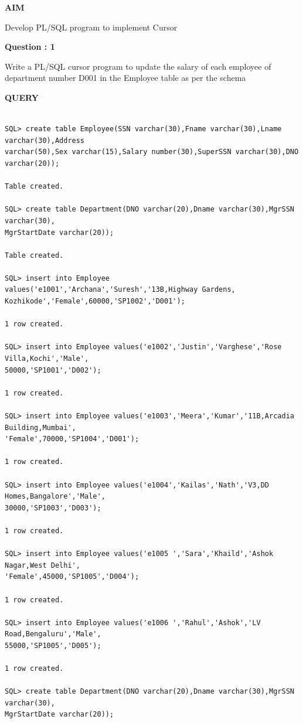 \documentclass[a4paper,12pt]{report}
\begin{document}
\begin{flushleft}
\textbf{AIM }
\end{flushleft}
Develop PL/SQL program to implement Cursor

\begin{flushleft}
    \textbf{Question : 1}
\end{flushleft}
Write a PL/SQL cursor program to update the salary of each employee of department number D001 in the Employee table as per the schema
\begin{flushleft}
\textbf{QUERY }
\end{flushleft}
 \begin{verbatim}

SQL> create table Employee(SSN varchar(30),Fname varchar(30),Lname varchar(30),Address
varchar(50),Sex varchar(15),Salary number(30),SuperSSN varchar(30),DNO varchar(20));

Table created.

SQL> create table Department(DNO varchar(20),Dname varchar(30),MgrSSN varchar(30),
MgrStartDate varchar(20));

Table created.

SQL> insert into Employee values('e1001','Archana','Suresh','13B,Highway Gardens,
Kozhikode','Female',60000,'SP1002','D001');

1 row created.

SQL> insert into Employee values('e1002','Justin','Varghese','Rose Villa,Kochi','Male',
50000,'SP1001','D002');

1 row created.

SQL> insert into Employee values('e1003','Meera','Kumar','11B,Arcadia Building,Mumbai',
'Female',70000,'SP1004','D001');

1 row created.

SQL> insert into Employee values('e1004','Kailas','Nath','V3,DD Homes,Bangalore','Male',
30000,'SP1003','D003');

1 row created.

SQL> insert into Employee values('e1005 ','Sara','Khaild','Ashok Nagar,West Delhi',
'Female',45000,'SP1005','D004');

1 row created.

SQL> insert into Employee values('e1006 ','Rahul','Ashok','LV Road,Bengaluru','Male',
55000,'SP1005','D005');

1 row created.

SQL> create table Department(DNO varchar(20),Dname varchar(30),MgrSSN varchar(30),
MgrStartDate varchar(20));


\end{verbatim}
\end{document}
